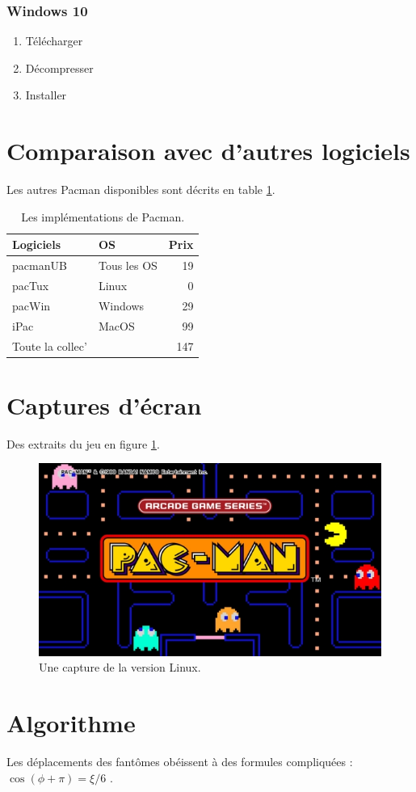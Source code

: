 \documentclass[11pt]{article}
\begin{document}
\subsubsection{Windows 10}
\label{sec:org95f8092}
\begin{enumerate}
\item Télécharger
\item Décompresser
\item Installer
\end{enumerate}

\section{Comparaison avec d'autres logiciels}
\label{sec:orgcc592eb}
Les autres Pacman disponibles sont décrits en table \ref{tab-concurrence}.

\begin{table}[htbp]
\centering
\begin{tabular}{llr}
\hline
Logiciels & OS & Prix\\
\hline
pacmanUB & Tous les OS & 19\\
pacTux & Linux & 0\\
pacWin & Windows & 29\\
iPac & MacOS & 99\\
\hline
Toute la collec' &  & 147\\
\hline
\end{tabular}
\caption{Les implémentations de Pacman. \label{tab-concurrence}}

\end{table}

\section{Captures d'écran}
\label{sec:orgc4e108f}
Des extraits du jeu en figure \ref{fig-capture}.

\begin{figure}[htbp]
\centering
\includegraphics[width=.9\linewidth]{./pacman.jpg}
\caption{Une capture de la version Linux. \label{fig-capture}}
\end{figure}

\section{Algorithme}
\label{sec:orgfa5aabd}
Les déplacements des fantômes obéissent à des formules compliquées : \(\cos(\phi + \pi) = \xi/6\) \cite{tao2016_AnalysisII}.



\end{document}
